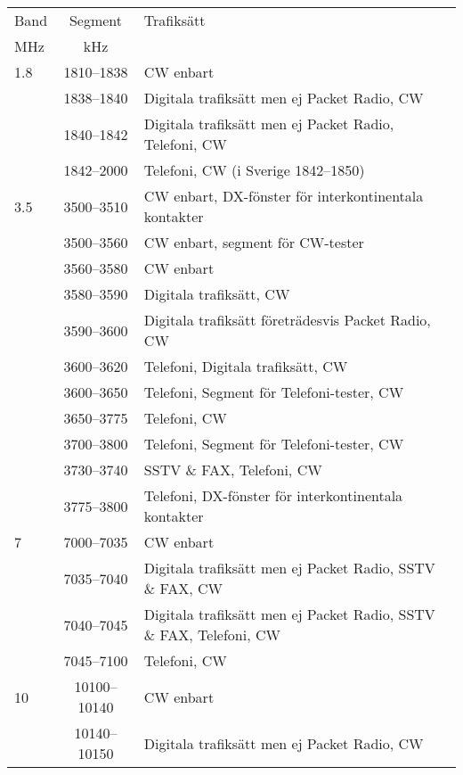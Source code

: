 \setlongtables
\begin{longtable}{lcl}
Band & Segment & Trafiksätt \\
MHz  & kHz     & \\ \hline
\endhead

1.8  & 1810--1838 & CW enbart \\
     & 1838--1840 & Digitala trafiksätt men ej Packet Radio, CW \\
     & 1840--1842 & Digitala trafiksätt men ej Packet Radio, Telefoni, CW \\
     & 1842--2000 & Telefoni, CW (i Sverige 1842--1850) \\

3.5  & 3500--3510 & CW enbart, DX-fönster för interkontinentala kontakter \\
     & 3500--3560 & CW enbart, segment för CW-tester \\
     & 3560--3580 & CW enbart \\
     & 3580--3590 & Digitala trafiksätt, CW \\
     & 3590--3600 & Digitala trafiksätt företrädesvis Packet Radio, CW \\
     & 3600--3620 & Telefoni, Digitala trafiksätt, CW \\
     & 3600--3650 & Telefoni, Segment för Telefoni-tester, CW \\
     & 3650--3775 & Telefoni, CW \\
     & 3700--3800 & Telefoni, Segment för Telefoni-tester, CW \\
     & 3730--3740 & SSTV \& FAX, Telefoni, CW \\
     & 3775--3800 & Telefoni, DX-fönster för interkontinentala kontakter \\

7    & 7000--7035 & CW enbart \\
     & 7035--7040 & Digitala trafiksätt men ej Packet Radio, SSTV \& FAX, CW \\
     & 7040--7045 & Digitala trafiksätt men ej Packet Radio, SSTV \& FAX, Telefoni, CW \\
     & 7045--7100 & Telefoni, CW \\

10   & 10100--10140 & CW enbart \\
     & 10140--10150 & Digitala trafiksätt men ej Packet Radio, CW \\


\end{longtable}
